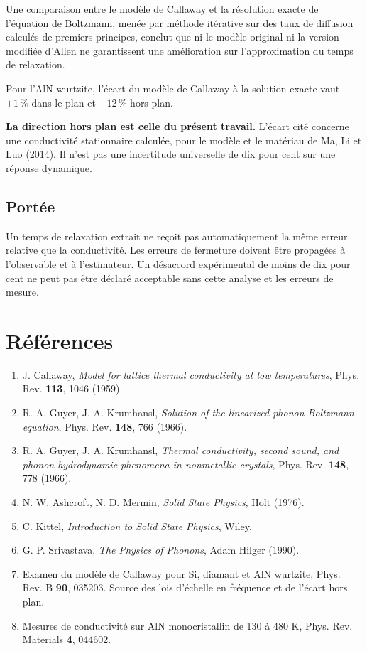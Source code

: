 \documentclass[11pt,a4paper]{article}
\begin{document}
Une comparaison entre le modèle de Callaway et la résolution exacte de l'équation de Boltzmann, menée
par méthode itérative sur des taux de diffusion calculés de premiers principes, conclut que ni le
modèle original ni la version modifiée d'Allen ne garantissent une amélioration sur l'approximation
du temps de relaxation.

Pour l'AlN wurtzite, l'écart du modèle de Callaway à la solution exacte vaut $+1\,\%$ dans le plan et
$-12\,\%$ hors plan.

\textbf{La direction hors plan est celle du présent travail.}
L'écart cité concerne une conductivité stationnaire calculée, pour le modèle
et le matériau de Ma, Li et Luo (2014). Il n'est pas une incertitude universelle
de dix pour cent sur une réponse dynamique.

\subsection{Portée}
Un temps de relaxation extrait ne reçoit pas automatiquement la même erreur
relative que la conductivité. Les erreurs de fermeture doivent être propagées
à l'observable et à l'estimateur. Un désaccord expérimental de moins de dix pour cent
ne peut pas être déclaré acceptable sans cette analyse et les erreurs de mesure.

\section{Références}

{\small
\begin{enumerate}[leftmargin=1.6em,itemsep=0pt]
\item J. Callaway, \emph{Model for lattice thermal conductivity at low temperatures}, Phys. Rev.
\textbf{113}, 1046 (1959).
\item R. A. Guyer, J. A. Krumhansl, \emph{Solution of the linearized phonon Boltzmann equation},
Phys. Rev. \textbf{148}, 766 (1966).
\item R. A. Guyer, J. A. Krumhansl, \emph{Thermal conductivity, second sound, and phonon
hydrodynamic phenomena in nonmetallic crystals}, Phys. Rev. \textbf{148}, 778 (1966).
\item N. W. Ashcroft, N. D. Mermin, \emph{Solid State Physics}, Holt (1976).
\item C. Kittel, \emph{Introduction to Solid State Physics}, Wiley.
\item G. P. Srivastava, \emph{The Physics of Phonons}, Adam Hilger (1990).
\item Examen du modèle de Callaway pour Si, diamant et AlN wurtzite, Phys. Rev. B \textbf{90},
035203. Source des lois d'échelle en fréquence et de l'écart hors plan.
\item Mesures de conductivité sur AlN monocristallin de 130 à 480 K, Phys. Rev. Materials
\textbf{4}, 044602.
\end{enumerate}}
\end{document}
